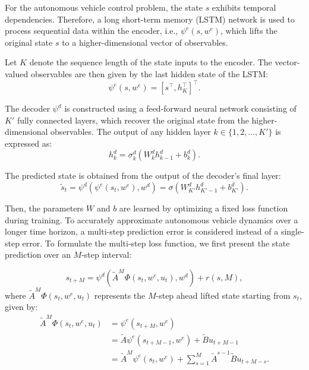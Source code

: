 \documentclass[pdflatex,sn-mathphys,Numbered]{sn-jnl}
\numberwithin{equation}{section}
\begin{document}
For the autonomous vehicle control problem, the state $s$ exhibits temporal dependencies. Therefore, a long short-term memory (LSTM) network is used to process sequential data within the encoder, i.e., $\psi^e(s, w^e)$, which lifts the original state $s$ to a higher-dimensional vector of observables. 

Let $K$ denote the sequence length of the state inputs to the encoder. The vector-valued observables are then given by the last hidden state of the LSTM:
\begin{equation}
\psi^e(s, w^e) = [s^\top, h_K^\top]^\top.  \label{equ:lstm_observables}
\end{equation}

The decoder $\psi^d$ is constructed using a feed-forward neural network consisting of $K'$ fully connected layers, which recover the original state from the higher-dimensional observables. The output of any hidden layer $k \in \{1, 2, \ldots, K'\}$ is expressed as:
\begin{equation}
h_k^d = \sigma_k^d (W_k^d h_{k-1}^d + b_k^d).  \label{equ:decoder_hidden}
\end{equation}

The predicted state is obtained from the output of the decoder's final layer:
\begin{equation}
\tilde{s}_t = \psi^d(\psi^e(s_t, w^e), w^d) = \sigma(W_{K'}^d h_{K'-1}^d + b_{K'}^d). \label{equ:decoder_output}
\end{equation}

Then, the parameters $W$ and $b$ are learned by optimizing a fixed loss function during training. To accurately approximate autonomous vehicle dynamics over a longer time horizon, a multi-step prediction error is considered instead of a single-step error. To formulate the multi-step loss function, we first present the state prediction over an $M$-step interval:

\begin{equation}
s_{t+M} = \psi^d( \widetilde{A}^M \Phi(s_t, w^e, u_t), w^d ) + r(s, M),  \label{equ:multi_step_prediction}
\end{equation}
where $\widetilde{A}^M \Phi(s_t, w^e, u_t)$ represents the $M$-step ahead lifted state starting from $s_t$, given by:
\begin{align}
\widetilde{A}^M \Phi(s_t, w^e, u_t) &= \psi^e(s_{t+M}, w^e) \nonumber \\
&= \widetilde{A} \psi^e(s_{t+M-1}, w^e) + \widetilde{B} u_{t+M-1} \nonumber \\
&= \widetilde{A}^M \psi^e(s_t, w^e) + \sum_{s=1}^{M} \widetilde{A}^{s-1} \widetilde{B} u_{t+M-s}. \label{equ:lifted_multistep}
\end{align}
\end{document}
